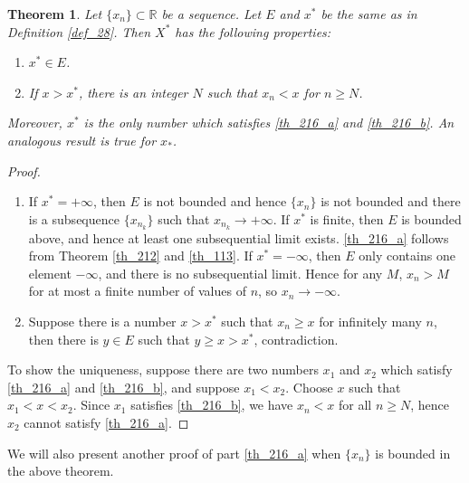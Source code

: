 \documentclass[10pt]{book}
\newtheorem{theorem}{Theorem}[chapter]
\theoremstyle{definition}
\numberwithin{equation}{chapter}
\begin{document}
\begin{theorem}\label{th_216}
Let $\{x_n\} \subset \mathbb{R}$ be a sequence. Let $E$ and $x^*$ be the same as in Definition \ref{def_28}. Then $X^*$ has the following properties:
\begin{enumerate}[label=(\alph*)]
    \item $x^* \in E$. \label{th_216_a}
    
    \item If $x > x^*$, there is an integer $N$ such that $x_n < x$ for $n \geq N$. \label{th_216_b}
\end{enumerate}
Moreover, $x^*$ is the only number which satisfies \ref{th_216_a} and \ref{th_216_b}. An analogous result is true for $x_*$.
\end{theorem}
\begin{proof}
~\begin{enumerate}[label=(\alph*)]
    \item If $x^* = + \infty$, then $E$ is not bounded and hence $\{x_n\}$ is not bounded and there is a subsequence $\{x_{n_k}\}$ such that $x_{n_k} \to + \infty$. If $x^*$ is finite, then $E$ is bounded above, and hence at least one subsequential limit exists. \ref{th_216_a} follows from Theorem \ref{th_212} and \ref{th_113}. If $x^* = - \infty$, then $E$ only contains one element $- \infty$, and there is no subsequential limit. Hence for any $M$, $x_n > M$ for at most a finite number of values of $n$, so $x_n \to - \infty$.
    
    \item Suppose there is a number $x > x^*$ such that $x_n \geq x$ for infinitely many $n$, then there is $y \in E$ such that $y \geq x > x^*$, contradiction.
\end{enumerate}
To show the uniqueness, suppose there are two numbers $x_1$ and $x_2$ which satisfy \ref{th_216_a} and \ref{th_216_b}, and suppose $x_1 < x_2$. Choose $x$ such that $x_1 < x < x_2$. Since $x_1$ satisfies \ref{th_216_b}, we have $x_n < x$ for all $n \geq N$, hence $x_2$ cannot satisfy \ref{th_216_a}.
\end{proof}

\medskip

We will also present another proof of part \ref{th_216_a} when $\{x_n\}$ is bounded in the above theorem.

\medskip
\end{document}

